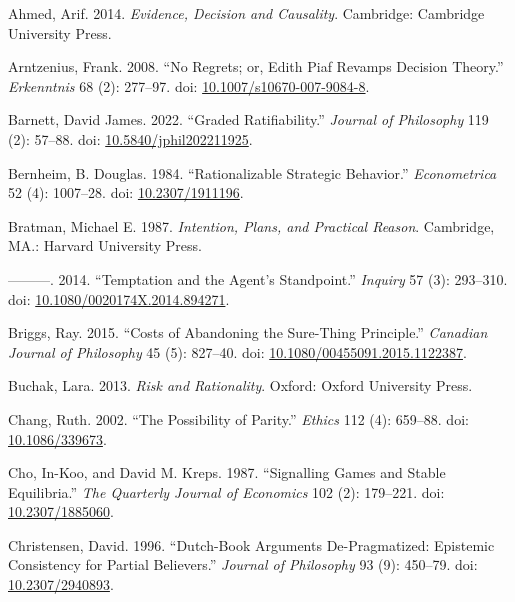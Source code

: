 \documentclass[
  10pt,
  letterpaper,
  DIV=11,
  numbers=noendperiod,
  twoside]{scrartcl}
\newlength{\cslhangindent}
\newenvironment{CSLReferences}[2] %
 {\begin{list}{}{%
  \setlength{\itemindent}{0pt}
  \setlength{\leftmargin}{0pt}
  \setlength{\parsep}{0pt}
  \ifodd #1
   \setlength{\leftmargin}{\cslhangindent}
   \setlength{\itemindent}{-1\cslhangindent}
  \fi
  \setlength{\itemsep}{#2\baselineskip}}}
 {\end{list}}
\begin{document}
\label{refs}
\begin{CSLReferences}{1}{0}
Ahmed, Arif. 2014. \emph{Evidence, Decision and Causality}. Cambridge:
{C}ambridge {U}niversity {P}ress.

Arntzenius, Frank. 2008. {``No Regrets; or, Edith Piaf Revamps Decision
Theory.''} \emph{Erkenntnis} 68 (2): 277--97. doi:
\href{https://doi.org/10.1007/s10670-007-9084-8}{10.1007/s10670-007-9084-8}.

Barnett, David James. 2022. {``Graded Ratifiability.''} \emph{Journal of
Philosophy} 119 (2): 57--88. doi:
\href{https://doi.org/10.5840/jphil202211925}{10.5840/jphil202211925}.

Bernheim, B. Douglas. 1984. {``Rationalizable Strategic Behavior.''}
\emph{Econometrica} 52 (4): 1007--28. doi:
\href{https://doi.org/10.2307/1911196}{10.2307/1911196}.

Bratman, Michael E. 1987. \emph{Intention, Plans, and Practical Reason}.
Cambridge, MA.: Harvard University Press.

---------. 2014. {``Temptation and the Agent's Standpoint.''}
\emph{Inquiry} 57 (3): 293--310. doi:
\href{https://doi.org/10.1080/0020174X.2014.894271}{10.1080/0020174X.2014.894271}.

Briggs, Ray. 2015. {``Costs of Abandoning the Sure-Thing Principle.''}
\emph{Canadian Journal of Philosophy} 45 (5): 827--40. doi:
\href{https://doi.org/10.1080/00455091.2015.1122387}{10.1080/00455091.2015.1122387}.

Buchak, Lara. 2013. \emph{Risk and Rationality}. Oxford: Oxford
University Press.

Chang, Ruth. 2002. {``The Possibility of Parity.''} \emph{Ethics} 112
(4): 659--88. doi:
\href{https://doi.org/10.1086/339673}{10.1086/339673}.

Cho, In-Koo, and David M. Kreps. 1987. {``Signalling Games and Stable
Equilibria.''} \emph{The Quarterly Journal of Economics} 102 (2):
179--221. doi: \href{https://doi.org/10.2307/1885060}{10.2307/1885060}.

Christensen, David. 1996. {``Dutch-Book Arguments {D}e-Pragmatized:
Epistemic Consistency for Partial Believers.''} \emph{Journal of
Philosophy} 93 (9): 450--79. doi:
\href{https://doi.org/10.2307/2940893}{10.2307/2940893}.


\end{CSLReferences}
\end{document}
